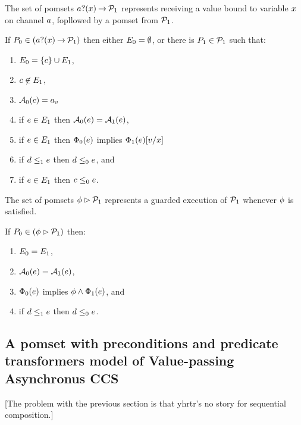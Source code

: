 The set of pomsets $\sRECV\aChan\aVar\sPREFIX\aPSS_1$ represents receiving a value bound to variable $x$ on channel $a$,
fopllowed by a pomset from $\mathcal{P}_1$.
\begin{definition}
  If $\aPS_0 \in (\sRECV\aChan\aVar\sPREFIX\aPSS_1)$ then either $E_0=\emptyset$, or there is $P_1\in\mathcal{P}_1$ such that:
  \begin{enumerate}
  \item $E_0 = \{c\} \cup E_1$,
  \item $c\not\in E_1$,
  \item $\mathcal{A}_0(c) = {a}_{v}$
  \item if $e\in E_1$ then $\mathcal{A}_0(e) = \mathcal{A}_1(e)$,
  \item if $e\in E_1$ then $\Phi_0(e)$ implies $\Phi_1(e)[v/x]$
  \item if $d\le_1e$ then $d\le_0e$, and
  \item if $e\in E_1$ then $c\le_0e$.
  \end{enumerate}
\end{definition}

The set of pomsets $\phi\mathbin\rhd\mathcal{P}_1$ represents a guarded execution of $\mathcal{P}_1$ whenever $\phi$ is satisfied.
\begin{definition}
  \label{defn:pomset-guard}
  If $P_0 \in (\phi\mathbin\rhd\mathcal{P}_1)$ then:
  \begin{enumerate}
  \item $E_0 = E_1$,
  \item $\mathcal{A}_0(e) = \mathcal{A}_1(e)$,
  \item $\Phi_0(e)$ implies $\phi\land\Phi_1(e)$, and
  \item if $d\le_1e$ then $d\le_0e$.
    \setcounter{pomsetGuardCount}{\value{enumi}}
  \end{enumerate}
\end{definition}

\subsection{A pomset with preconditions and predicate transformers model of Value-passing Asynchronus CCS}

[The problem with the previous section is that yhrtr's no story for sequential composition.]


